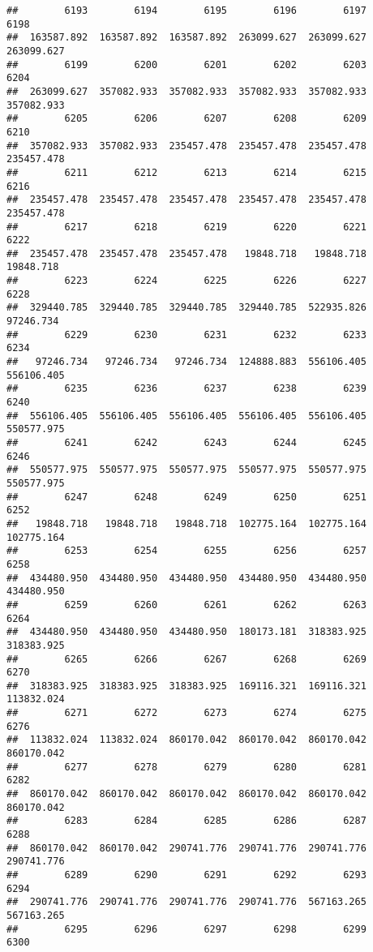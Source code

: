 \documentclass[
]{book}
\begin{document}
\begin{verbatim}
##        6193        6194        6195        6196        6197        6198 
##  163587.892  163587.892  163587.892  263099.627  263099.627  263099.627 
##        6199        6200        6201        6202        6203        6204 
##  263099.627  357082.933  357082.933  357082.933  357082.933  357082.933 
##        6205        6206        6207        6208        6209        6210 
##  357082.933  357082.933  235457.478  235457.478  235457.478  235457.478 
##        6211        6212        6213        6214        6215        6216 
##  235457.478  235457.478  235457.478  235457.478  235457.478  235457.478 
##        6217        6218        6219        6220        6221        6222 
##  235457.478  235457.478  235457.478   19848.718   19848.718   19848.718 
##        6223        6224        6225        6226        6227        6228 
##  329440.785  329440.785  329440.785  329440.785  522935.826   97246.734 
##        6229        6230        6231        6232        6233        6234 
##   97246.734   97246.734   97246.734  124888.883  556106.405  556106.405 
##        6235        6236        6237        6238        6239        6240 
##  556106.405  556106.405  556106.405  556106.405  556106.405  550577.975 
##        6241        6242        6243        6244        6245        6246 
##  550577.975  550577.975  550577.975  550577.975  550577.975  550577.975 
##        6247        6248        6249        6250        6251        6252 
##   19848.718   19848.718   19848.718  102775.164  102775.164  102775.164 
##        6253        6254        6255        6256        6257        6258 
##  434480.950  434480.950  434480.950  434480.950  434480.950  434480.950 
##        6259        6260        6261        6262        6263        6264 
##  434480.950  434480.950  434480.950  180173.181  318383.925  318383.925 
##        6265        6266        6267        6268        6269        6270 
##  318383.925  318383.925  318383.925  169116.321  169116.321  113832.024 
##        6271        6272        6273        6274        6275        6276 
##  113832.024  113832.024  860170.042  860170.042  860170.042  860170.042 
##        6277        6278        6279        6280        6281        6282 
##  860170.042  860170.042  860170.042  860170.042  860170.042  860170.042 
##        6283        6284        6285        6286        6287        6288 
##  860170.042  860170.042  290741.776  290741.776  290741.776  290741.776 
##        6289        6290        6291        6292        6293        6294 
##  290741.776  290741.776  290741.776  290741.776  567163.265  567163.265 
##        6295        6296        6297        6298        6299        6300 

\end{verbatim}
\end{document}
